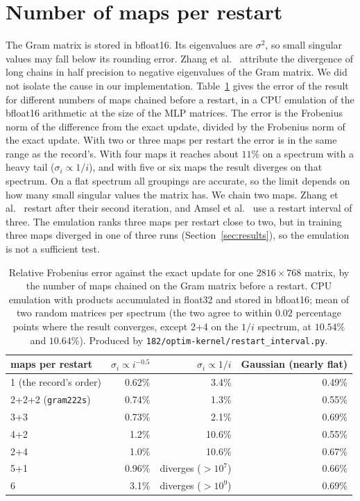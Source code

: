 \documentclass{article}
\begin{document}
\section{Number of maps per restart}\label{app:restart}
The Gram matrix is stored in bfloat16. Its eigenvalues are $\sigma^2$, so small singular values may fall below its rounding error. Zhang et al.~\cite{gramns} attribute the divergence of long chains in half precision to negative eigenvalues of the Gram matrix. We did not isolate the cause in our implementation. Table~\ref{tab:restart} gives the error of the result for different numbers of maps chained before a restart, in a CPU emulation of the bfloat16 arithmetic at the size of the MLP matrices. The error is the Frobenius norm of the difference from the exact update, divided by the Frobenius norm of the exact update. With two or three maps per restart the error is in the same range as the record's. With four maps it reaches about $11\%$ on a spectrum with a heavy tail ($\sigma_i\propto 1/i$), and with five or six maps the result diverges on that spectrum. On a flat spectrum all groupings are accurate, so the limit depends on how many small singular values the matrix has. We chain two maps. Zhang et al.~\cite{gramns} restart after their second iteration, and Amsel et al.~\cite{polar} use a restart interval of three. The emulation ranks three maps per restart close to two, but in training three maps diverged in one of three runs (Section~\ref{sec:results}), so the emulation is not a sufficient test.

\begin{table}[!htbp]\centering\small
\begin{tabular}{lrrr}\toprule
maps per restart & $\sigma_i\propto i^{-0.5}$ & $\sigma_i\propto 1/i$ & Gaussian (nearly flat)\\\midrule
1 (the record's order) & 0.62\% & 3.4\% & 0.49\%\\
2+2+2 (\texttt{gram222s}) & 0.74\% & 1.3\% & 0.55\%\\
3+3 & 0.73\% & 2.1\% & 0.69\%\\
4+2 & 1.2\% & 10.6\% & 0.55\%\\
2+4 & 1.0\% & 10.6\% & 0.67\%\\
5+1 & 0.96\% & diverges ($>10^{7}$) & 0.66\%\\
6 & 3.1\% & diverges ($>10^{9}$) & 0.69\%\\\bottomrule
\end{tabular}
\caption{Relative Frobenius error against the exact update for one $2816\times768$ matrix, by the number of maps chained on the Gram matrix before a restart. CPU emulation with products accumulated in float32 and stored in bfloat16; mean of two random matrices per spectrum (the two agree to within $0.02$ percentage points where the result converges, except 2+4 on the $1/i$ spectrum, at $10.54\%$ and $10.64\%$). Produced by \texttt{182/optim-kernel/restart\_interval.py}.}\label{tab:restart}
\end{table}
\end{document}
